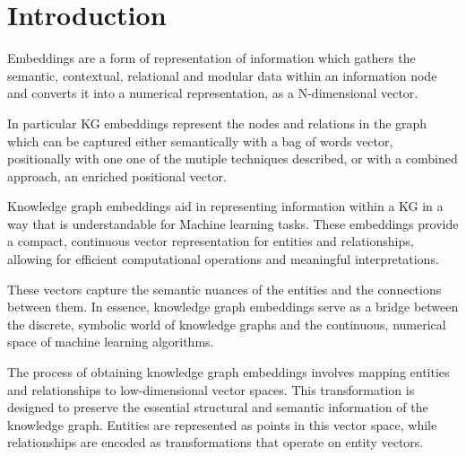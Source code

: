 
\section{Introduction}\label{sec:emb-intro}
Embeddings are a form of representation of information which gathers the semantic, contextual, relational and modular data within an information node and converts it into a numerical representation, as a N-dimensional vector.

In particular KG embeddings represent the nodes and relations in the graph which can be captured either semantically with a bag of words vector, positionally with one one of the mutiple techniques described, or with a combined approach, an enriched positional vector.

Knowledge graph embeddings aid in representing information within a KG in a way that is understandable for Machine learning tasks. These embeddings provide a compact, continuous vector representation for entities and relationships, allowing for efficient computational operations and meaningful interpretations.

These vectors capture the semantic nuances of the entities and the connections between them. In essence, knowledge graph embeddings serve as a bridge between the discrete, symbolic world of knowledge graphs and the continuous, numerical space of machine learning algorithms.

The process of obtaining knowledge graph embeddings involves mapping entities and relationships to low-dimensional vector spaces. This transformation is designed to preserve the essential structural and semantic information of the knowledge graph. Entities are represented as points in this vector space, while relationships are encoded as transformations that operate on entity vectors.

